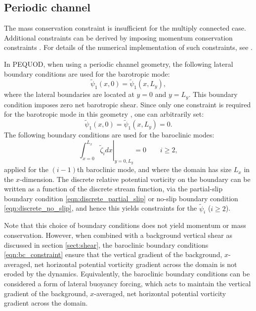 \documentclass[a4paper]{book}
\newcommand{\pequod}{PEQUOD}
\begin{document}
\subsection{Periodic channel}\label{sect:multiply_connected}

The mass conservation constraint is insufficient for the multiply connected
case. Additional constraints can be derived by imposing momentum conservation
constraints \citep{mcwilliams1977}. For details of the numerical implementation
of such constraints, see \citet{hogg2006}.

In \pequod, when using a periodic channel geometry, the following lateral
boundary conditions are used for the barotropic mode:
\begin{equation}
  \tilde{\psi}_1 \left( x, 0 \right) = \tilde{\psi}_1 \left( x, L_y \right),
\end{equation}
where the lateral boundaries are located at $y = 0$ and $y = L_y$. This boundary
condition imposes zero net barotropic shear. Since only one constraint is
required for the barotropic mode in this geometry \citep{mcwilliams1977}, one
can arbitrarily set:
\begin{equation}\label{eqn:bt_constraint}
  \tilde{\psi}_1 \left( x, 0 \right) = \tilde{\psi}_1 \left( x, L_y \right) = 0.
\end{equation}
The following boundary conditions are used for the baroclinic modes:
\begin{equation}\label{eqn:bc_constraint}
  \left. \int_{x = 0}^{L_x} \tilde{\zeta}_i dx \right|_{y = 0, L_y} = 0 \qquad i \geq 2,
\end{equation}
applied for the $\left( i - 1 \right)$th baroclinic mode, and where the domain has size $L_x$ in
the $x$-dimension. The discrete relative potential vorticity on the boundary can be written as
a function of the discrete stream function, via the partial-slip boundary
condition \eqref{eqn:discrete_partial_slip} or no-slip boundary condition
\eqref{eqn:discrete_no_slip}, and hence this yields constraints for the
$\tilde{\psi}_i$ ($i \geq 2$).

Note that this choice of boundary conditions does not yield momentum or mass
conservation. However, when combined with a background vertical shear as
discussed in section \ref{sect:shear}, the baroclinic boundary conditions
\eqref{eqn:bc_constraint} ensure that the vertical gradient of the background,
$x$-averaged, net horizontal potential vorticity gradient across the domain is not eroded by the dynamics.
Equivalently, the baroclinic boundary conditions can be considered a form of
lateral buoyancy forcing, which acts to maintain the vertical gradient of the background,
$x$-averaged, net horizontal potential vorticity gradient across the domain.
\end{document}
